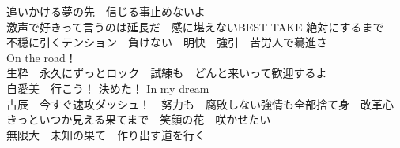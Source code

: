 {追いかける夢の先　信じる事止めないよ\\[1em]

激声で好きって言うのは延長だ　感に堪えないBEST TAKE 絶対にするまで\\
不穏に引くテンション　負けない　明快　強引　苦労人で驀進さ\\[-.3em]

On the road！\\
生粋　永久にずっとロック　試練も　どんと来いって歓迎するよ\\
自愛美　行こう！ 決めた！ In my dream\\
古辰　今すぐ速攻ダッシュ！　努力も　腐敗しない強情も全部捨て身　改革心\\[-.3em]

きっといつか見える果てまで　笑顔の花　咲かせたい\\
無限大　未知の果て　作り出す道を行く

}



